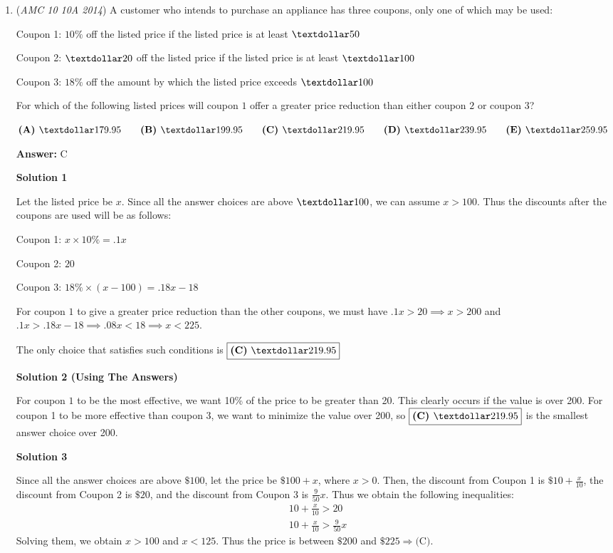 \begin{enumerate}
	\item (\textit{AMC 10 10A 2014}) A customer who intends to purchase an appliance has three coupons, only one of which may be used:


 Coupon 1: $10\%$ off the listed price if the listed price is at least $\textdollar50$


 Coupon 2: $\textdollar 20$ off the listed price if the listed price is at least $\textdollar100$


 Coupon 3: $18\%$ off the amount by which the listed price exceeds $\textdollar100$


 For which of the following listed prices will coupon $1$ offer a greater price reduction than either coupon $2$ or coupon $3$?


 $\textbf{(A) }\textdollar179.95\qquad \textbf{(B) }\textdollar199.95\qquad \textbf{(C) }\textdollar219.95\qquad \textbf{(D) }\textdollar239.95\qquad \textbf{(E) }\textdollar259.95\qquad$

 \textbf{Answer: }C



\textbf{Solution 1}

Let the listed price be $x$. Since all the answer choices are above $\textdollar100$, we can assume $x > 100$. Thus the discounts after the coupons are used will be as follows:

 Coupon 1: $x\times10\%=.1x$

 Coupon 2: $20$

 Coupon 3: $18\%\times(x-100)=.18x-18$

 
For coupon $1$ to give a greater price reduction than the other coupons, we must have $.1x>20\implies x>200$ and $.1x>.18x-18\implies.08x<18\implies x<225$.

 The only choice that satisfies such conditions is $\boxed{\textbf{(C)}\ \textdollar219.95}$




\textbf{Solution 2 (Using The Answers)}

For coupon $1$ to be the most effective, we want 10\% of the price to be greater than 20. This clearly occurs if the value is over 200. For coupon 1 to be more effective than coupon 3, we want to minimize the value over 200, so $\boxed{\textbf{(C) }\textdollar219.95}$ is the smallest answer choice over 200.

 



\textbf{Solution 3}

Since all the answer choices are above $\$100$, let the price be $\$100 + x$, where $x > 0$. Then, the discount from Coupon 1 is $\$10 + \frac{x}{10}$, the discount from Coupon 2 is $\$20$, and the discount from Coupon 3 is $\frac{9}{50}x$. Thus we obtain the following inequalities: \begin{align*}&10 + \frac{x}{10} > 20 \\&10 + \frac{x}{10} > \frac{9}{50}x\end{align*}
Solving them, we obtain $x > 100$ and $x < 125$. Thus the price is between $\$200$ and $\$225\Rightarrow \boxed{\text{(C)}}$.


\end{enumerate}
